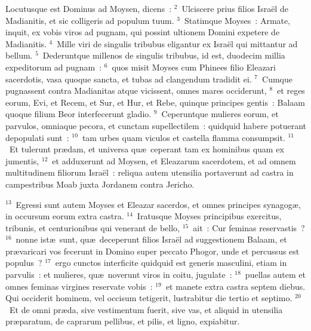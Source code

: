 \lettrine[lines=3,image=true,loversize=0.05,lraise=-0.03]{L}{}ocutusque est Dominus ad Moysen, dicens~:
${}^{2}$~Ulciscere prius filios Isra\"el de Madianitis, et sic colligeris ad populum tuum.
${}^{3}$~Statimque Moyses~: Armate, inquit, ex vobis viros ad pugnam, qui possint ultionem Domini expetere de Madianitis.
${}^{4}$~Mille viri de singulis tribubus eligantur ex Isra\"el qui mittantur ad bellum.
${}^{5}$~Dederuntque millenos de singulis tribubus, id est, duodecim millia expeditorum ad pugnam~:
${}^{6}$~quos misit Moyses cum Phinees filio Eleazari sacerdotis, vasa quoque sancta, et tubas ad clangendum tradidit ei.
${}^{7}$~Cumque pugnassent contra Madianitas atque vicissent, omnes mares occiderunt,
${}^{8}$~et reges eorum, Evi, et Recem, et Sur, et Hur, et Rebe, quinque principes gentis~: Balaam quoque filium Beor interfecerunt gladio.
${}^{9}$~Ceperuntque mulieres eorum, et parvulos, omniaque pecora, et cunctam supellectilem~: quidquid habere potuerant depopulati sunt~:
${}^{10}$~tam urbes quam viculos et castella flamma consumpsit.
${}^{11}$~Et tulerunt pr\ae dam, et universa qu\ae\ ceperant tam ex hominibus quam ex jumentis,
${}^{12}$~et adduxerunt ad Moysen, et Eleazarum sacerdotem, et ad omnem multitudinem filiorum Isra\"el~: reliqua autem utensilia portaverunt ad castra in campestribus Moab juxta Jordanem contra Jericho.


${}^{13}$~Egressi sunt autem Moyses et Eleazar sacerdos, et omnes principes synagog\ae , in occursum eorum extra castra.
${}^{14}$~Iratusque Moyses principibus exercitus, tribunis, et centurionibus qui venerant de bello,
${}^{15}$~ait~: Cur feminas reservastis~?
${}^{16}$~nonne ist\ae\ sunt, qu\ae\ deceperunt filios Isra\"el ad suggestionem Balaam, et pr\ae varicari vos fecerunt in Domino super peccato Phogor, unde et percussus est populus~?
${}^{17}$~ergo cunctos interficite quidquid est generis masculini, etiam in parvulis~: et mulieres, qu\ae\ noverunt viros in coitu, jugulate~:
${}^{18}$~puellas autem et omnes feminas virgines reservate vobis~:
${}^{19}$~et manete extra castra septem diebus. Qui occiderit hominem, vel occisum tetigerit, lustrabitur die tertio et septimo.
${}^{20}$~Et de omni pr\ae da, sive vestimentum fuerit, sive vas, et aliquid in utensilia pr\ae paratum, de caprarum pellibus, et pilis, et ligno, expiabitur.


